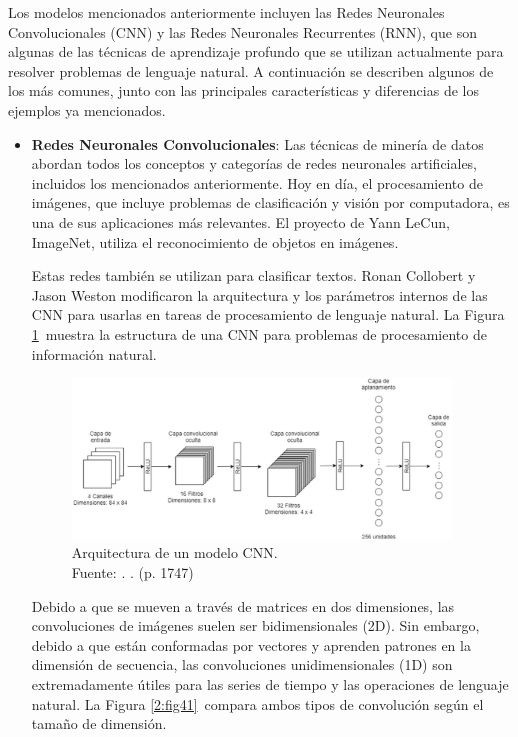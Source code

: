Los modelos mencionados anteriormente incluyen las Redes Neuronales Convolucionales (CNN) y las Redes Neuronales Recurrentes (RNN), que son algunas de las técnicas de aprendizaje profundo que se utilizan actualmente para resolver problemas de lenguaje natural. A continuación se describen algunos de los más comunes, junto con las principales características y diferencias de los ejemplos ya mencionados.

\begin{itemize}
	\item \textbf{Redes Neuronales Convolucionales}: Las técnicas de minería de datos abordan todos los conceptos y categorías de redes neuronales artificiales, incluidos los mencionados anteriormente. Hoy en día, el procesamiento de imágenes, que incluye problemas de clasificación y visión por computadora, es una de sus aplicaciones más relevantes. El proyecto de Yann LeCun, ImageNet, utiliza el reconocimiento de objetos en imágenes.
	
	Estas redes también se utilizan para clasificar textos. Ronan Collobert y Jason Weston modificaron la arquitectura y los parámetros internos de las CNN para usarlas en tareas de procesamiento de lenguaje natural. La Figura \ref{2:fig40} muestra la estructura de una CNN para problemas de procesamiento de información natural. \parencite{bk_kamath2019deeplearning_nlp_sr}
	\begin{figure}[!ht]
		\begin{center}
			\includegraphics[width=0.95\textwidth]{2/figures/cnn_nlp.png}
			\caption[Arquitectura de un modelo CNN]{Arquitectura de un modelo CNN.\\
			Fuente: \cite{tec_kim2014convolutional}. . (p. 1747)}
			\label{2:fig40}
		\end{center}
	\end{figure}
	
	Debido a que se mueven a través de matrices en dos dimensiones, las convoluciones de imágenes suelen ser bidimensionales (2D). Sin embargo, debido a que están conformadas por vectores y aprenden patrones en la dimensión de secuencia, las convoluciones unidimensionales (1D) son extremadamente útiles para las series de tiempo y las operaciones de lenguaje natural. La Figura \ref{2:fig41} compara ambos tipos de convolución según el tamaño de dimensión. \parencite{bk_rao2019nlp_pytorch}


\end{itemize}
